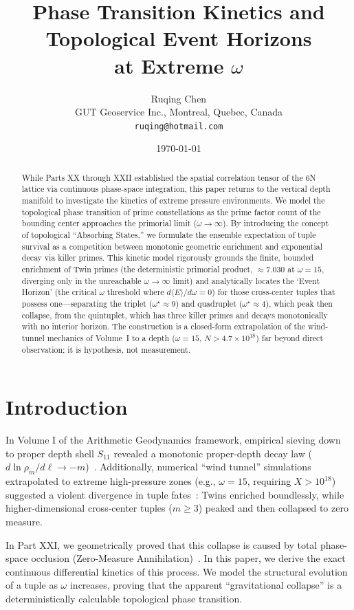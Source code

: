 \documentclass[11pt,a4paper]{article}
\title{\Large \textbf{Phase Transition Kinetics and Topological Event Horizons\\ at Extreme $\omega$}}
\author{Ruqing Chen\\
\small GUT Geoservice Inc., Montreal, Quebec, Canada\\
\small \texttt{ruqing@hotmail.com}}
\date{\today}
\begin{document}
\maketitle

\begin{abstract}
While Parts XX through XXII established the spatial correlation tensor of the 6N lattice via continuous phase-space integration, this paper returns to the vertical depth manifold to investigate the kinetics of extreme pressure environments. We model the topological phase transition of prime constellations as the prime factor count of the bounding center approaches the primorial limit ($\omega \to \infty$). By introducing the concept of topological ``Absorbing States,'' we formulate the ensemble expectation of tuple survival as a competition between monotonic geometric enrichment and exponential decay via killer primes. This kinetic model rigorously grounds the finite, bounded enrichment of Twin primes (the deterministic primorial product, $\approx 7.030$ at $\omega=15$, diverging only in the unreachable $\omega\to\infty$ limit) and analytically locates the `Event Horizon' (the critical $\omega$ threshold where $d\langle E\rangle/d\omega = 0$) for those cross-center tuples that possess one---separating the triplet ($\omega^\star\!\approx\!9$) and quadruplet ($\omega^\star\!\approx\!4$), which peak then collapse, from the quintuplet, which has three killer primes and decays monotonically with no interior horizon. The construction is a closed-form extrapolation of the wind-tunnel mechanics of Volume~I to a depth ($\omega=15$, $N>4.7\times10^{18}$) far beyond direct observation; it is hypothesis, not measurement.
\end{abstract}

\section{Introduction}
In Volume I of the Arithmetic Geodynamics framework, empirical sieving down to proper depth shell $S_{11}$ revealed a monotonic proper-depth decay law ($d\ln\rho_m/d\ell \to -m$)~\cite{ChenXVII,ChenXIX}. Additionally, numerical ``wind tunnel'' simulations extrapolated to extreme high-pressure zones (e.g., $\omega=15$, requiring $X > 10^{18}$) suggested a violent divergence in tuple fates~\cite{Review}: Twins enriched boundlessly, while higher-dimensional cross-center tuples ($m \ge 3$) peaked and then collapsed to zero measure.

In Part XXI, we geometrically proved that this collapse is caused by total phase-space occlusion (Zero-Measure Annihilation)~\cite{ChenXXI}. In this paper, we derive the exact continuous differential kinetics of this process. We model the structural evolution of a tuple as $\omega$ increases, proving that the apparent ``gravitational collapse'' is a deterministically calculable topological phase transition.
\end{document}
